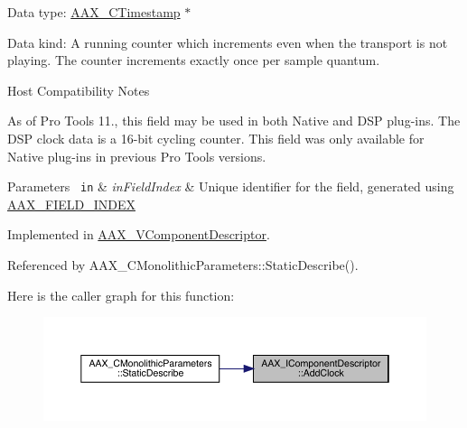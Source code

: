 \begin{DoxyItemize}
\item Data type\+: \mbox{\hyperlink{a00392_aae7325dbfa53a983f208a68cb563fba5}{A\+A\+X\+\_\+\+C\+Timestamp}} $\ast$
\item Data kind\+: A running counter which increments even when the transport is not playing. The counter increments exactly once per sample quantum.

\begin{DoxyRefDesc}{Host Compatibility Notes}
\item[\mbox{\hyperlink{a00786__compatibility_notes000054}{Host Compatibility Notes}}]As of Pro Tools 11., this field may be used in both Native and D\+SP plug-\/ins. The D\+SP clock data is a 16-\/bit cycling counter. This field was only available for Native plug-\/ins in previous Pro Tools versions.\end{DoxyRefDesc}

\end{DoxyItemize}


\begin{DoxyParams}[1]{Parameters}
\mbox{\texttt{ in}}  & {\em in\+Field\+Index} & Unique identifier for the field, generated using \mbox{\hyperlink{a00392_acf807247ecd6e5899dc9dc31644e9a1d}{A\+A\+X\+\_\+\+F\+I\+E\+L\+D\+\_\+\+I\+N\+D\+EX}} \\
\hline
\end{DoxyParams}


Implemented in \mbox{\hyperlink{a01901_a4da0588e0e1fb6c1b74af10ac525a35e}{A\+A\+X\+\_\+\+V\+Component\+Descriptor}}.



Referenced by A\+A\+X\+\_\+\+C\+Monolithic\+Parameters\+::\+Static\+Describe().

Here is the caller graph for this function\+:
\nopagebreak
\begin{figure}[H]
\begin{center}
\leavevmode
\includegraphics[width=350pt]{a01781_a59727dee1043fcd7f14da130ab254445_icgraph}
\end{center}
\end{figure}
\mbox{\label{a01781_a1e0c9508d1eb0c9a60a87a0fb69f1dbe}} 
